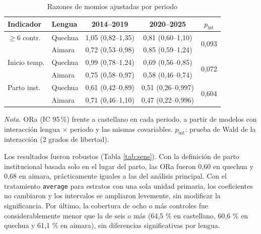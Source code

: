 \documentclass[
  spanish,
  letterpaper,
  conference]{IEEEtran}
\newcommand{\notatabla}[1]{\par\vspace{2pt}\parbox{\linewidth}{\footnotesize\emph{Nota.} #1}}
\begin{document}
\begin{table}[!t]
\centering
\caption{Razones de momios ajustadas por periodo}
\label{tab:periodo}
\footnotesize
\setlength{\tabcolsep}{2.2pt}
\begin{tabular*}{\columnwidth}{@{\extracolsep{\fill}}llccc@{}}
\toprule
Indicador & Lengua & 2014--2019 & 2020--2025 & $p_{\mathrm{int}}$ \\
\midrule
$\geq$6 contr. & Quechua & 1,05 (0,82--1,35) & 0,81 (0,60--1,10) & \multirow{2}{*}{0,093} \\
 & Aimara & 0,72 (0,53--0,98) & 0,85 (0,59--1,24) &  \\
\addlinespace
Inicio temp. & Quechua & 0,99 (0,78--1,24) & 0,69 (0,56--0,85) & \multirow{2}{*}{0,072} \\
 & Aimara & 0,75 (0,58--0,97) & 0,58 (0,46--0,74) &  \\
\addlinespace
Parto inst. & Quechua & 0,61 (0,42--0,89) & 0,51 (0,26--0,997) & \multirow{2}{*}{0,604} \\
 & Aimara & 0,71 (0,46--1,10) & 0,47 (0,22--0,996) &  \\
\bottomrule
\end{tabular*}
\notatabla{ORa (IC 95\,\%) frente a castellano en cada periodo, a partir de modelos con interacción lengua $\times$ periodo y las mismas covariables. $p_{\mathrm{int}}$: prueba de Wald de la interacción (2 grados de libertad).}
\end{table}

Los resultados fueron robustos (Tabla \ref{tab:sens}). Con la definición
de parto institucional basada solo en el lugar del parto, las ORa fueron
0,60 en quechua y 0,68 en aimara, prácticamente iguales a las del
análisis principal. Con el tratamiento \texttt{average} para estratos
con una sola unidad primaria, los coeficientes no cambiaron y los
intervalos se ampliaron levemente, sin modificar la significancia. Por
último, la cobertura de ocho o más controles fue considerablemente menor
que la de seis o más (64,5 \% en castellano, 60,6 \% en quechua y 61,1
\% en aimara), sin diferencias significativas por lengua.
\end{document}
